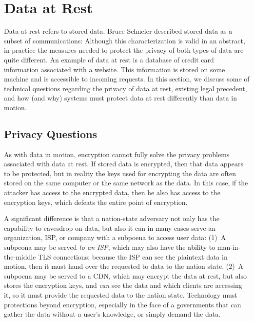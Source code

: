 \section{Data at Rest}
\label{sec:rest}

Data at rest refers to stored data. Bruce Schneier described stored data as a
subset of communications:  Although
this characterization is valid in an abstract, in practice the measures needed
to protect the privacy of both types of data are quite different.  An example
of data at rest is a database of credit card information associated with a
website. This information is stored on some machine and is accessible to
incoming requests. In this section, we discuss some of technical questions
regarding the privacy of data at rest, existing legal precedent, and how (and
why) systems must protect data at rest differently than data in motion.

\subsection{Privacy Questions}  

As with data in motion, encryption cannot fully solve the privacy problems
associated with data at rest.  If stored data is encrypted, then that data
appears to be protected, but in reality the keys used for encrypting the data
are often stored on the same computer or the same network as the data.  In
this case, if the attacker has access to the encrypted data, then he also has
access to the encryption keys, which defeats the entire point of encryption.

A significant difference is that a nation-state adversary not only has the
capability to eavesdrop on data, but also it can in many cases serve an
organization, ISP, or company with a subpoena to access user data: (1)~A
subpeona may be served {\em to an ISP}, which may also have the ability to
man-in-the-middle TLS connections; because the ISP can see the plaintext data
in motion, then it must hand over the requested to data to the nation state,
(2)~A subpoena may be served to a CDN, which may encrypt the data at rest, but
also stores the encryption keys, and {\it can} see the data and which clients
are accessing it, so it must provide the requested data to the nation state.
Technology must protections beyond encryption, especially in the face of a
governments that can gather the data without a user's knowledge, or simply
demand the data.

